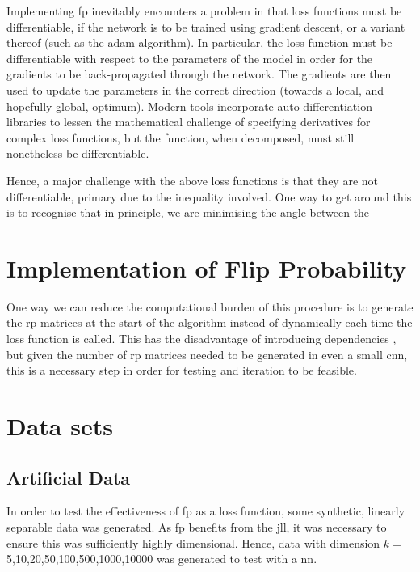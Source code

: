 
Implementing  \gls{fp} inevitably encounters a problem in that loss functions must be differentiable, if the network is to be trained using gradient descent, or a variant thereof (such as the  \gls{adam} algorithm). In particular, the loss function must be differentiable with respect to the parameters of the model in order for the gradients to be back-propagated through the network. The gradients are then used to update the parameters in the correct direction (towards a local, and hopefully global, optimum). Modern tools incorporate auto-differentiation libraries to lessen the mathematical challenge of specifying derivatives for complex loss functions, but the function, when decomposed, must still nonetheless be differentiable.
\bigskip

Hence, a major challenge with the above loss functions is that they are not differentiable, primary due to the inequality involved. One way to get around this is to recognise that in principle, we are minimising the angle between the 

\section{Implementation of Flip Probability}

One way we can reduce the computational burden of this procedure is to generate the \gls{rp} matrices at the start of the algorithm instead of dynamically each time the loss function is called. This has the disadvantage of introducing dependencies \cite{bob_rp_storage}, but given the number of \gls{rp} matrices needed to be generated in even a small \gls{cnn}, this is a necessary step in order for testing and iteration to be feasible. 
\bigskip

\section{Data sets}
 
\subsection{Artificial Data}

In order to test the effectiveness of \gls{fp} as a loss function, some synthetic, linearly separable data was generated. As  \gls{fp} benefits from the  \gls{jll}, it was necessary to ensure this was sufficiently highly dimensional. Hence, data with dimension $k =$ 5,10,20,50,100,500,1000,10000 was generated to test with a  \gls{nn}. 
\bigskip

